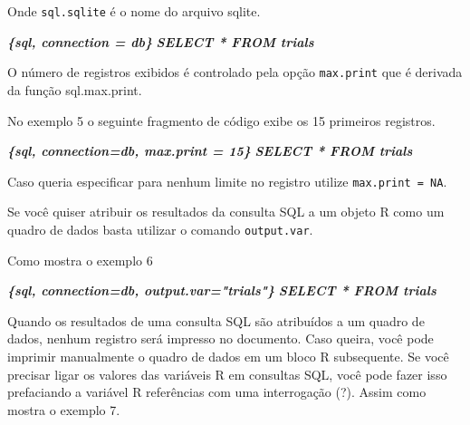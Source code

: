\documentclass[
]{book}
\newenvironment{Shaded}{\begin{snugshade}}{\end{snugshade}}
\newcommand{\InformationTok}[1]{\textcolor[rgb]{0.56,0.35,0.01}{\textbf{\textit{#1}}}}
\begin{document}
Onde \texttt{sql.sqlite} é o nome do arquivo sqlite.

\begin{Shaded}
\begin{Highlighting}[]
 \InformationTok{\textasciigrave{}\textasciigrave{}\textasciigrave{}\{sql, connection = db\}}
\InformationTok{SELECT * FROM trials}
\InformationTok{\textasciigrave{}\textasciigrave{}\textasciigrave{}}
\end{Highlighting}
\end{Shaded}

O número de registros exibidos é controlado pela opção \texttt{max.print} que é derivada da função sql.max.print.

No exemplo 5 o seguinte fragmento de código exibe os 15 primeiros registros.

\begin{Shaded}
\begin{Highlighting}[]
 \InformationTok{\textasciigrave{}\textasciigrave{}\textasciigrave{}\{sql, connection=db, max.print = 15\}}
\InformationTok{SELECT * FROM trials}
\InformationTok{\textasciigrave{}\textasciigrave{}\textasciigrave{}}
\end{Highlighting}
\end{Shaded}

Caso queria especificar para nenhum limite no registro utilize \texttt{max.print\ =\ NA}.

Se você quiser atribuir os resultados da consulta SQL a um objeto R como um quadro de dados basta utilizar o comando \texttt{output.var}.

Como mostra o exemplo 6

\begin{Shaded}
\begin{Highlighting}[]
 \InformationTok{\textasciigrave{}\textasciigrave{}\textasciigrave{}\{sql, connection=db, output.var="trials"\}}
\InformationTok{SELECT * FROM trials}
\InformationTok{\textasciigrave{}\textasciigrave{}\textasciigrave{}}
\end{Highlighting}
\end{Shaded}

Quando os resultados de uma consulta SQL são atribuídos a um quadro de dados, nenhum registro será impresso no documento. Caso queira, você pode imprimir manualmente o quadro de dados em um bloco R subsequente. Se você precisar ligar os valores das variáveis R em consultas SQL, você pode fazer isso prefaciando a variável R referências com uma interrogação (?). Assim como mostra o exemplo 7.
\end{document}
